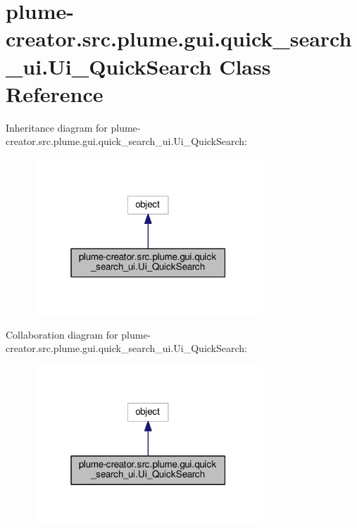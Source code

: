 \hypertarget{classplume-creator_1_1src_1_1plume_1_1gui_1_1quick__search__ui_1_1_ui___quick_search}{}\section{plume-\/creator.src.\+plume.\+gui.\+quick\+\_\+search\+\_\+ui.\+Ui\+\_\+\+Quick\+Search Class Reference}
\label{classplume-creator_1_1src_1_1plume_1_1gui_1_1quick__search__ui_1_1_ui___quick_search}


Inheritance diagram for plume-\/creator.src.\+plume.\+gui.\+quick\+\_\+search\+\_\+ui.\+Ui\+\_\+\+Quick\+Search\+:\nopagebreak
\begin{figure}[H]
\begin{center}
\leavevmode
\includegraphics[width=244pt]{classplume-creator_1_1src_1_1plume_1_1gui_1_1quick__search__ui_1_1_ui___quick_search__inherit__graph}
\end{center}
\end{figure}


Collaboration diagram for plume-\/creator.src.\+plume.\+gui.\+quick\+\_\+search\+\_\+ui.\+Ui\+\_\+\+Quick\+Search\+:\nopagebreak
\begin{figure}[H]
\begin{center}
\leavevmode
\includegraphics[width=244pt]{classplume-creator_1_1src_1_1plume_1_1gui_1_1quick__search__ui_1_1_ui___quick_search__coll__graph}
\end{center}
\end{figure}
